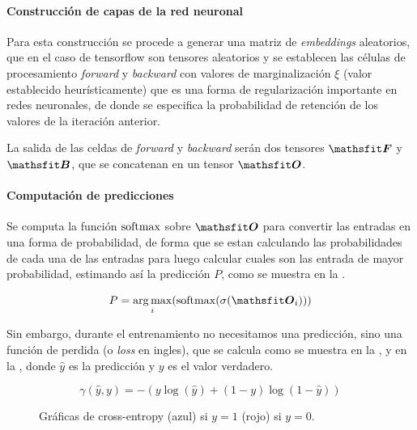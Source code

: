 \paragraph{Construcción de capas de la red neuronal}
Para esta construcción se procede a generar una matriz de \emph{embeddings} aleatorios, que en el caso de \gls{tensorflow} son tensores aleatorios y se establecen las células de procesamiento \emph{forward} y \emph{backward} con valores de marginalización $\xi$ (valor establecido heurísticamente) que es una forma de regularización importante en redes neuronales, de donde se especifica la probabilidad de retención de los valores de la iteración anterior.

La salida de las celdas de \emph{forward} y \emph{backward} serán dos tensores $\tF$ y $\tB$, que se concatenan en un tensor $\tO$.

\paragraph{Computación de predicciones}
Se computa la función $\mathrm{softmax}$ sobre $\tO$ para convertir las entradas en una forma de probabilidad, de forma que se estan calculando las probabilidades de cada una de las entradas para luego calcular cuales son las entrada de mayor probabilidad, estimando así la predicción $P$, como se muestra en la .

\begin{equation} \label{eq:bilstm-pred}
  P = \argmax_i (\softmax(\sigmoid(\tO_i)))
\end{equation}

Sin embargo, durante el entrenamiento no necesitamos una predicción, sino una función de perdida (o \emph{loss} en ingles), que se calcula como se muestra en la , y en la , donde $\hat{y}$ es la predicción y $y$ es el valor verdadero.

\begin{equation} \label{eq:cross-entropy-loss}
  \gamma(\hat{y}, y) = -{(y\log(\hat{y}) + (1 - y)\log(1 - \hat{y}))}
\end{equation}

\begin{figure}[H]
  \centering
\decoRule
\caption[Gráficas de cross-entropy]{Gráficas de cross-entropy (azul) si $y = 1$ (rojo) si $y = 0$.}
\label{fig:cross-entropy-y1}
\end{figure}

